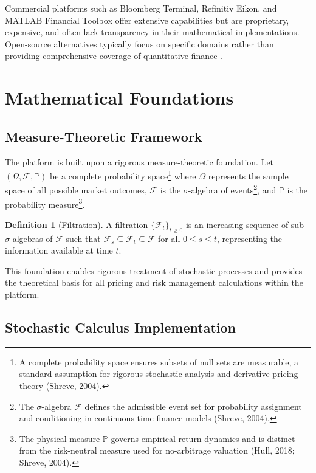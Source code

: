 \documentclass[12pt,a4paper]{article}
\theoremstyle{definition}
\newtheorem{definition}[theorem]{Definition}
\theoremstyle{remark}
\begin{document}
Commercial platforms such as Bloomberg Terminal, Refinitiv Eikon, and MATLAB Financial Toolbox offer extensive capabilities but are proprietary, expensive, and often lack transparency in their mathematical implementations. Open-source alternatives typically focus on specific domains rather than providing comprehensive coverage of quantitative finance \citep{tsay2010analysis}.

\section{Mathematical Foundations}

\subsection{Measure-Theoretic Framework}

The platform is built upon a rigorous measure-theoretic foundation. Let $(\Omega, \mathcal{F}, \mathbb{P})$ be a complete probability space\footnote{A complete probability space ensures subsets of null sets are measurable, a standard assumption for rigorous stochastic analysis and derivative-pricing theory (Shreve, 2004).} where $\Omega$ represents the sample space of all possible market outcomes, $\mathcal{F}$ is the $\sigma$-algebra of events\footnote{The $\sigma$-algebra $\mathcal{F}$ defines the admissible event set for probability assignment and conditioning in continuous-time finance models (Shreve, 2004).}, and $\mathbb{P}$ is the probability measure\footnote{The physical measure $\mathbb{P}$ governs empirical return dynamics and is distinct from the risk-neutral measure used for no-arbitrage valuation (Hull, 2018; Shreve, 2004).}.

\begin{definition}[Filtration]
A filtration $\{\mathcal{F}_t\}_{t \geq 0}$ is an increasing sequence of sub-$\sigma$-algebras of $\mathcal{F}$ such that $\mathcal{F}_s \subseteq \mathcal{F}_t \subseteq \mathcal{F}$ for all $0 \leq s \leq t$, representing the information available at time $t$.
\end{definition}

This foundation enables rigorous treatment of stochastic processes and provides the theoretical basis for all pricing and risk management calculations within the platform.

\subsection{Stochastic Calculus Implementation}
\end{document}
